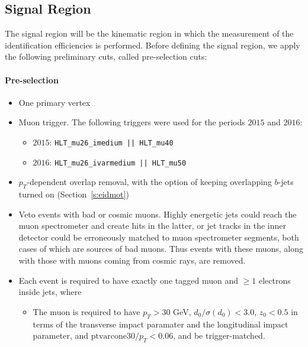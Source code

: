 \subsection{Signal Region}\label{ss:eidsr}

The signal region will be the kinematic region in which the measurement of the
identification efficiencies is performed. Before defining the signal region, we
apply the following preliminary cuts, called pre-selection cuts:

\paragraph{Pre-selection}

\begin{itemize}[label=]
	\item One primary vertex

	\item Muon trigger. The following triggers were used for the periods $2015$
	      and $2016$:

	      \begin{itemize}
		      \item $2015$: \texttt{HLT_mu26_imedium || HLT_mu40}
		      \item $2016$:  \texttt{HLT_mu26_ivarmedium || HLT_mu50}
	      \end{itemize}

	\item $p_T$-dependent overlap removal, with the option of keeping overlapping
	      $b$-jets turned on (Section~\ref{s:eidmot})

	\item Veto events with bad or cosmic muons. Highly energetic jets could reach
	      the muon spectrometer and create hits in the latter, or jet tracks in the inner
	      detector could be erroneously matched to muon spectrometer segments, both cases
	      of which are sources of bad muons. Thus events with these muons, along with
	      those with muons coming from cosmic rays, are removed.

	\item Each event is required to have exactly one tagged muon and $\geq 1$
	      electrons inside jets, where

	      \begin{itemize}

		      \item The muon is required to have $p_T > 30$ GeV, $d_0 / \sigma(d_0) < 3.0$,
		            $z_0 < 0.5$ in terms of the transverse impact paramater and the longitudinal
		            impact parameter, and $\text{ptvarcone}30 / p_T < 0.06$, and be
		            trigger-matched.


\end{itemize}
\end{itemize}
